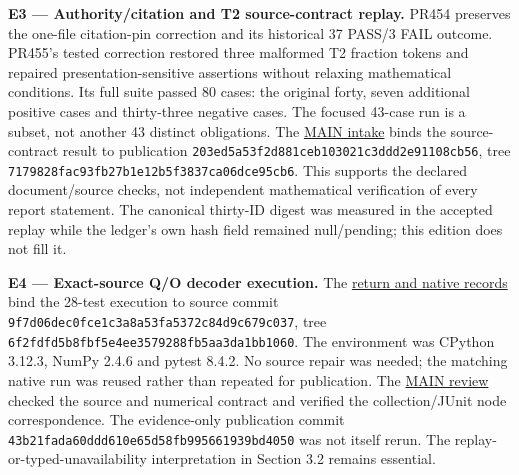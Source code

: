 \documentclass[
  11pt,
  a4paper]{article}
\begin{document}
\textbf{E3 --- Authority/citation and T2 source-contract replay.} PR454 preserves the one-file citation-pin correction and its historical 37 PASS/3 FAIL outcome. PR455's tested correction restored three malformed T2 fraction tokens and repaired presentation-sensitive assertions without relaxing mathematical conditions. Its full suite passed 80 cases: the original forty, seven additional positive cases and thirty-three negative cases. The focused 43-case run is a subset, not another 43 distinct obligations. The \href{https://github.com/cosmosapjw-quantum/htt_base/pull/455\#issuecomment-5557570489}{MAIN intake} binds the source-contract result to publication {\ttfamily\nolinkurl{203ed5a53f2d881ceb103021c3ddd2e91108cb56}}, tree {\ttfamily\nolinkurl{7179828fac93fb27b1e12b5f3837ca06dce95cb6}}. This supports the declared document/source checks, not independent mathematical verification of every report statement. The canonical thirty-ID digest was measured in the accepted replay while the ledger's own hash field remained null/pending; this edition does not fill it.

\textbf{E4 --- Exact-source Q/O decoder execution.} The \href{https://github.com/cosmosapjw-quantum/htt_base/blob/43b21fada60ddd610e65d58fb995661939bd4050/artifacts/research_reports/pr451_main_local_20260906T150921Z/RETURN_TO_MAIN.md}{return and native records} bind the 28-test execution to source commit {\ttfamily\nolinkurl{9f7d06dec0fce1c3a8a53fa5372c84d9c679c037}}, tree {\ttfamily\nolinkurl{6f2fdfd5b8fbf5e4ee3579288fb5aa3da1bb1060}}. The environment was CPython 3.12.3, NumPy 2.4.6 and pytest 8.4.2. No source repair was needed; the matching native run was reused rather than repeated for publication. The \href{https://github.com/cosmosapjw-quantum/htt_base/pull/456\#issuecomment-5560742944}{MAIN review} checked the source and numerical contract and verified the collection/JUnit node correspondence. The evidence-only publication commit {\ttfamily\nolinkurl{43b21fada60ddd610e65d58fb995661939bd4050}} was not itself rerun. The replay-or-typed-unavailability interpretation in Section 3.2 remains essential.
\end{document}
